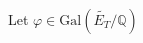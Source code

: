 \documentclass[preview]{standalone}
\begin{document}
\begin{center}
Let $\varphi \in \text{Gal}\left(\widetilde{E_T}/\mathbb{Q}\right)$
\end{center}
\end{document}
